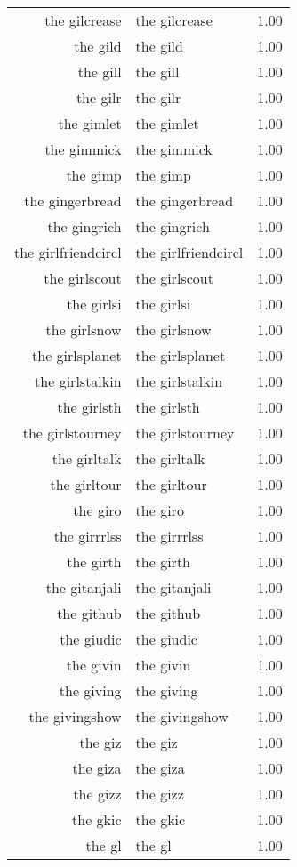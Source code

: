 \begin{table}[ht]
\begin{tabular}{rlr}
  the gilcrease & the gilcrease & 1.00 \\ 
  the gild & the gild & 1.00 \\ 
  the gill & the gill & 1.00 \\ 
  the gilr & the gilr & 1.00 \\ 
  the gimlet & the gimlet & 1.00 \\ 
  the gimmick & the gimmick & 1.00 \\ 
  the gimp & the gimp & 1.00 \\ 
  the gingerbread & the gingerbread & 1.00 \\ 
  the gingrich & the gingrich & 1.00 \\ 
  the girlfriendcircl & the girlfriendcircl & 1.00 \\ 
  the girlscout & the girlscout & 1.00 \\ 
  the girlsi & the girlsi & 1.00 \\ 
  the girlsnow & the girlsnow & 1.00 \\ 
  the girlsplanet & the girlsplanet & 1.00 \\ 
  the girlstalkin & the girlstalkin & 1.00 \\ 
  the girlsth & the girlsth & 1.00 \\ 
  the girlstourney & the girlstourney & 1.00 \\ 
  the girltalk & the girltalk & 1.00 \\ 
  the girltour & the girltour & 1.00 \\ 
  the giro & the giro & 1.00 \\ 
  the girrrlss & the girrrlss & 1.00 \\ 
  the girth & the girth & 1.00 \\ 
  the gitanjali & the gitanjali & 1.00 \\ 
  the github & the github & 1.00 \\ 
  the giudic & the giudic & 1.00 \\ 
  the givin & the givin & 1.00 \\ 
  the giving & the giving & 1.00 \\ 
  the givingshow & the givingshow & 1.00 \\ 
  the giz & the giz & 1.00 \\ 
  the giza & the giza & 1.00 \\ 
  the gizz & the gizz & 1.00 \\ 
  the gkic & the gkic & 1.00 \\ 
  the gl & the gl & 1.00 \\ 

\end{tabular}
\end{table}
